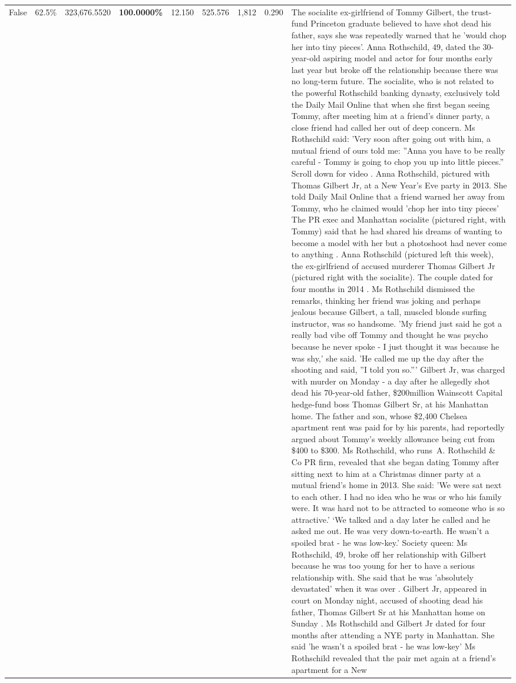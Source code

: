 \begin{table}[H]
\begin{tabular}{lllrlllll}
False & 62.5\% & 323,676.5520 & \bfseries \color{red} 100.0000\% & 12.150 & 525.576 & 1,812 & 0.290 & The socialite ex-girlfriend of Tommy Gilbert, the trust-fund Princeton graduate believed to have shot dead his father, says she was repeatedly warned that he 'would chop her into tiny pieces'. Anna Rothschild, 49, dated the 30-year-old aspiring model and actor for four months early last year but broke off the relationship because there was no long-term future. The socialite, who is not related to the powerful Rothschild banking dynasty, exclusively told the Daily Mail Online that when she first began seeing Tommy, after meeting him at a friend's dinner party, a close friend had called her out of deep concern. Ms Rothschild said: 'Very soon after going out with him, a mutual friend of ours told me: ''Anna you have to be really careful - Tommy is going to chop you up into little pieces.'' Scroll down for video . Anna Rothschild, pictured with Thomas Gilbert Jr, at a New Year's Eve party in 2013. She told Daily Mail Online that a friend warned her away from Tommy, who he claimed would 'chop her into tiny pieces' The PR exec and Manhattan socialite (pictured right, with Tommy) said that he had shared his dreams of wanting to become a model with her but a photoshoot had never come to anything . Anna Rothschild (pictured left this week), the ex-girlfriend of accused murderer Thomas Gilbert Jr (pictured right with the socialite). The couple dated for four months in 2014 . Ms Rothschild dismissed the remarks, thinking her friend was joking and perhaps jealous because Gilbert, a tall, muscled blonde surfing instructor, was so handsome. 'My friend just said he got a really bad vibe off Tommy and thought he was psycho because he never spoke - I just thought it was because he was shy,' she said. 'He called me up the day after the shooting and said, ''I told you so.''' Gilbert Jr, was charged with murder on Monday - a day after he allegedly shot dead his 70-year-old father, \$200million Wainscott Capital hedge-fund boss Thomas Gilbert Sr, at his Manhattan home. The father and son, whose \$2,400 Chelsea apartment rent was paid for by his parents, had reportedly argued about Tommy's weekly allowance being cut from \$400 to \$300. Ms Rothschild, who runs A. Rothschild \& Co PR firm, revealed that she began dating Tommy after sitting next to him at a Christmas dinner party at a mutual friend's home in 2013. She said: 'We were sat next to each other. I had no idea who he was or who his family were. It was hard not to be attracted to someone who is so attractive.' ‘We talked and a day later he called and he asked me out. He was very down-to-earth. He wasn’t a spoiled brat - he was low-key.’ Society queen: Ms Rothschild, 49, broke off her relationship with Gilbert because he was too young for her to have a serious relationship with. She said that he was 'absolutely devastated' when it was over . Gilbert Jr, appeared in court on Monday night, accused of shooting dead his father, Thomas Gilbert Sr at his Manhattan home on Sunday . Ms Rothschild and Gilbert Jr dated for four months after attending a NYE party in Manhattan. She said 'he wasn't a spoiled brat - he was low-key' Ms Rothschild revealed that the pair met again at a friend’s apartment for a New 
\end{tabular}
\end{table}
